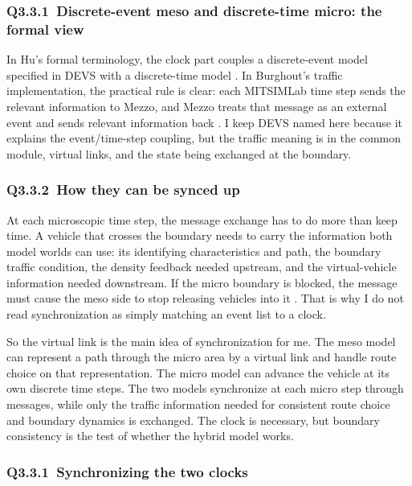 \begin{bibunit}[plainnat]
\subsubsection*{Q3.3.1\ Discrete-event meso and discrete-time micro: the formal view}

In Hu's formal terminology, the clock part couples a discrete-event model specified in DEVS with a discrete-time model \citep{hu2023ddds}. In Burghout's traffic implementation, the practical rule is clear: each MITSIMLab time step sends the relevant information to Mezzo, and Mezzo treats that message as an external event and sends relevant information back \citep{burghout2005hybrid,burghout2006discrete}. I keep DEVS named here because it explains the event/time-step coupling, but the traffic meaning is in the common module, virtual links, and the state being exchanged at the boundary.

\subsubsection*{Q3.3.2\ How they can be synced up}

At each microscopic time step, the message exchange has to do more than keep time. A vehicle that crosses the boundary needs to carry the information both model worlds can use: its identifying characteristics and path, the boundary traffic condition, the density feedback needed upstream, and the virtual-vehicle information needed downstream. If the micro boundary is blocked, the message must cause the meso side to stop releasing vehicles into it \citep{burghout2006loading}. That is why I do not read synchronization as simply matching an event list to a clock.

So the virtual link is the main idea of synchronization for me. The meso model can represent a path through the micro area by a virtual link and handle route choice on that representation. The micro model can advance the vehicle at its own discrete time steps. The two models synchronize at each micro step through messages, while only the traffic information needed for consistent route choice and boundary dynamics is exchanged. The clock is necessary, but boundary consistency is the test of whether the hybrid model works.
\fi

\subsubsection{Q3.3.1\ Synchronizing the two clocks}


\end{bibunit}
